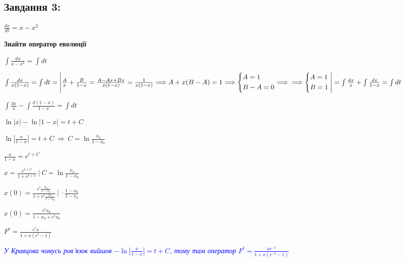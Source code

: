 \subsection{Завдання 3:}

$\frac{dx}{dt} = x - x^2$

\textbf{Знайти оператор еволюції}

$\int \frac{dx}{x - x^2} = \int dt$
\label{pr2:tsk3}

$\int \frac{dx}{x(1-x)} = \int dt = \Bigg{|}\frac{A}{x} + \frac{B}{1-x} = \frac{A - Ax + Bx}{x(1-x)} = \frac{1}{x(1-x)}
\Longrightarrow A +x(B-A) = 1\Longrightarrow \left\{\begin{aligned}
    &A = 1\\
    &B-A = 0
\end{aligned}\right. \Longrightarrow \\\Longrightarrow \left\{\begin{aligned}
    &A = 1\\
    &B = 1
\end{aligned}\right. \Bigg{|} = \int \frac{dx}{x} + \int \frac{dx}{1-x} = \int dt$

$\int \frac{dx}{x} - \int \frac{d(1-x)}{1-x} = \int dt$

$\ln|x| - \ln |1-x| = t +C$

$\ln |\frac{x}{1-x}| = t + C \ \Longrightarrow\ C = \ln \frac{x_0}{1-x_0}$

$\frac{x}{1-x} = e^{t+C}$

$x = \frac{e^{t+C}}{1+e^{t +C}} \ | \ C = \ln \frac{x_0}{1-x_0}$

$x(0) = \frac{e^t\frac{x_0}{1-x_0}}{1+e^t\frac{x_0}{1-x_0}} \ |\ \cdot \frac{1-x_0}{1-x_0}$

$x(0) = \frac{e^tx_0}{1-x_0 + e^tx_0}$

$F^t = \frac{e^tx}{1+x(e^t- 1)}$

\textcolor{blue}{\textit{У Кравцова чомусь ров'язок вийшов $-\ln |\frac{x}{1-x}| = t +C$, тому там оператор }
$F^t = \frac{xe^{-t}}{1+x(e^{-t} - 1 )}$}